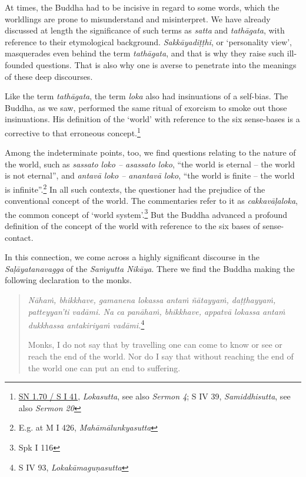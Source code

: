 At times, the Buddha had to be incisive in regard to some words, which the worldlings are prone to misunderstand and misinterpret. We have already discussed at length the significance of such terms as \emph{satta} and \emph{tathāgata}, with reference to their etymological background. \emph{Sakkāyadiṭṭhi}, or `personality view', masquerades even behind the term \emph{tathāgata}, and that is why they raise such ill-founded questions. That is also why one is averse to penetrate into the meanings of these deep discourses.

Like the term \emph{tathāgata}, the term \emph{loka} also had insinuations of a self-bias. The Buddha, as we saw, performed the same ritual of exorcism to smoke out those insinuations. His definition of the `world' with reference to the six sense-bases is a corrective to that erroneous concept.\footnote{\href{https://suttacentral.net/sn1.70/pli/ms}{SN 1.70 / S I 41}, \emph{Lokasutta}, see also \emph{Sermon 4}; S IV 39, \emph{Samiddhisutta}, see also \emph{Sermon 20}}

Among the indeterminate points, too, we find questions relating to the nature of the world, such as \emph{sassato loko -- asassato loko}, ``the world is eternal -- the world is not eternal'', and \emph{antavā loko -- anantavā loko}, ``the world is finite -- the world is infinite''.\footnote{E.g. at M I 426, \emph{Mahāmālunkyasutta}} In all such contexts, the questioner had the prejudice of the conventional concept of the world. The commentaries refer to it as \emph{cakkavāḷaloka}, the common concept of `world system'.\footnote{Spk I 116} But the Buddha advanced a profound definition of the concept of the world with reference to the six bases of sense-contact.

In this connection, we come across a highly significant discourse in the \emph{Saḷāyatanavagga} of the \emph{Saṁyutta Nikāya}. There we find the Buddha making the following declaration to the monks.

\begin{quote}
\emph{Nāhaṁ, bhikkhave, gamanena lokassa antaṁ ñātayyaṁ, daṭṭhayyaṁ, patteyyan'ti vadāmi. Na ca panāhaṁ, bhikkhave, appatvā lokassa antaṁ dukkhassa antakiriyaṁ vadāmi.}\footnote{S IV 93, \emph{Lokakāmaguṇasutta}}

Monks, I do not say that by travelling one can come to know or see or reach the end of the world. Nor do I say that without reaching the end of the world one can put an end to suffering.
\end{quote}

